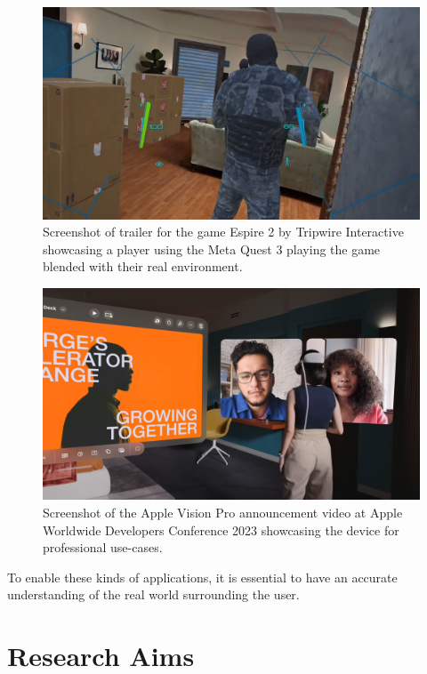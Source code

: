 \begin{figure}[h!t]
    \centering
    \includegraphics[width=0.8\linewidth]{images/Tripwire Interactive - Espire 2 Mixed Reality Update Trailer [50DD3XwjOIA - 2001x1126 - 0m21s]}
    \caption{Screenshot of trailer for the game Espire 2 by Tripwire Interactive showcasing a player using the Meta Quest 3 playing the game blended with their real environment.}
    \label{fig:quest3-example}
\end{figure}

\begin{figure}[h!t]
    \centering
    \includegraphics[width=0.8\linewidth]{images/Apple - Introducing Apple Vision Pro [TX9qSaGXFyg - 2001x1126 - 4m41s]}
    \caption{Screenshot of the Apple Vision Pro announcement video at Apple Worldwide Developers Conference 2023 showcasing the device for professional use-cases.}
    \label{fig:visonpro-example}
\end{figure}

To enable these kinds of applications, it is essential to have an accurate understanding of the real world surrounding the user.



\section{Research Aims}

